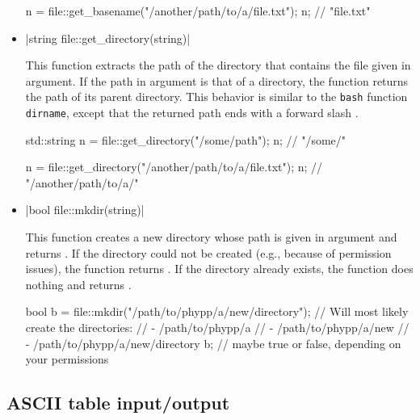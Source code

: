 \documentclass[12pt]{report}
\newcommand*\circled[1]{\tikz[baseline=(char.base)]{
            \node[shape=circle,draw,inner sep=0.0pt] (char) {#1};}}
\newcommand{\vectorfuncsym}{\circled{$\hspace{-1pt}\mathcal{V}$}\xspace}
\newcommand{\vectorfunc}{\vectorfuncsym\hspace{2pt}\xspace}
\newenvironment{example}
{
    \begin{mdframed}[style=example,frametitle={Example}]
}
{
    \end{mdframed}
}
\newcommand{\cpptrue}{\cppinline{true}\xspace}
\newcommand{\cppfalse}{\cppinline{false}\xspace}
\begin{document}
\begin{itemize}
\begin{example}
\begin{cppcode}
n = file::get_basename("/another/path/to/a/file.txt");
n; // "file.txt"
\end{cppcode}
\end{example}

\item \vectorfunc \cppinline|string file::get_directory(string)| 

This function extracts the path of the directory that contains the file given in argument. If the path in argument is that of a directory, the function returns the path of its parent directory. This behavior is similar to the \texttt{bash} function \texttt{dirname}, except that the returned path ends with a forward slash \cppinline{/}.

\begin{example}
\begin{cppcode}
std::string n = file::get_directory("/some/path");
n; // "/some/"

n = file::get_directory("/another/path/to/a/file.txt");
n; // "/another/path/to/a/"
\end{cppcode}
\end{example}

\item \vectorfunc \cppinline|bool file::mkdir(string)| 

This function creates a new directory whose path is given in argument and returns \cpptrue. If the directory could not be created (e.g., because of permission issues), the function returns \cppfalse. If the directory already exists, the function does nothing and returns \cpptrue.

\begin{example}
\begin{cppcode}
bool b = file::mkdir("/path/to/phypp/a/new/directory");
// Will most likely create the directories:
//  - /path/to/phypp/a
//  - /path/to/phypp/a/new
//  - /path/to/phypp/a/new/directory
b; // maybe true or false, depending on your permissions
\end{cppcode}
\end{example}

\end{itemize}

\subsection{ASCII table input/output \label{SEC:support:file:ascii}}
\end{document}
